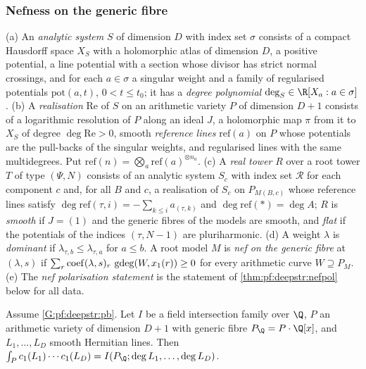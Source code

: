 \subsubsection*{Nefness on the generic fibre}

\begin{definition}\label{def:pf:deepstr:ansys}
(a) An \emph{analytic system} $S$ of dimension $D$ with index set $\sigma$ consists of a compact Hausdorff space
$X_S$ with a holomorphic atlas of dimension $D$, a positive potential, a line potential with a section whose
divisor has strict normal crossings, and for each $a\in\sigma$ a singular weight and a family of regularised
potentials $\mathrm{pot}(a,t)$, $0<t\le t_0$; it has a \emph{degree polynomial} $\deg_S\in\R[X_a:a\in\sigma]$.
(b) A \emph{realisation} $\mathrm{Re}$ of $S$ on an arithmetic variety $P$ of dimension $D+1$ consists of a
logarithmic resolution of $P$ along an ideal $J$, a holomorphic map $\pi$ from it to $X_S$ of degree
$\deg\mathrm{Re}>0$, smooth \emph{reference lines} $\mathrm{ref}(a)$ on $P$ whose potentials are the pull-backs of the
singular weights, and regularised lines with the same multidegrees. Put $\mathrm{ref}(n)=\bigotimes_a\mathrm{ref}(a)^{\otimes n_a}$.
(c) A \emph{real tower} $R$ over a root tower $T$ of type $(\Psi,N)$ consists of an analytic system $S_c$ with
index set $\mathcal R$ for each component $c$ and, for all $B$ and $c$, a realisation of $S_c$ on $P_{M(B,c)}$ whose
reference lines satisfy $\deg\mathrm{ref}(\tau,i)=-\sum_{k\le i}a_{(\tau,k)}$ and $\deg\mathrm{ref}(\ast)=\deg A$; $R$ is \emph{smooth} if $J=(1)$ and the generic fibres of the models are smooth, and \emph{flat} if the
potentials of the indices $(\tau,N-1)$ are pluriharmonic.
(d) A weight $\lambda$ is \emph{dominant} if $\lambda_{\tau,b}\le\lambda_{\tau,a}$ for $a\le b$. A root model $M$ is \emph{nef on the
generic fibre} at $(\lambda,s)$ if $\sum_r\mathrm{coef}(\lambda,s)_r\,\operatorname{gdeg}(W,x_1(r))\ge0$ for every arithmetic curve
$W\supseteq P_M$.
(e) The \emph{nef polarisation statement} is the statement of \cref{thm:pf:deepstr:nefpol} below for all
data.
\end{definition}

\begin{lemma}\label{lem:pf:deepstr:genericfibre}
Assume \ref{G:pf:deepstr:pb}. Let $I$ be a field intersection family over $\Q$, $P$ an arithmetic variety of dimension
$D+1$ with generic fibre $P_\Q=P\cdot\Q[x]$, and $L_1,\dots,L_D$ smooth Hermitian lines. Then
$\int_Pc_1(L_1)\cdots c_1(L_D)=I(P_\Q;\deg L_1,\dots,\deg L_D)$.
\end{lemma}

